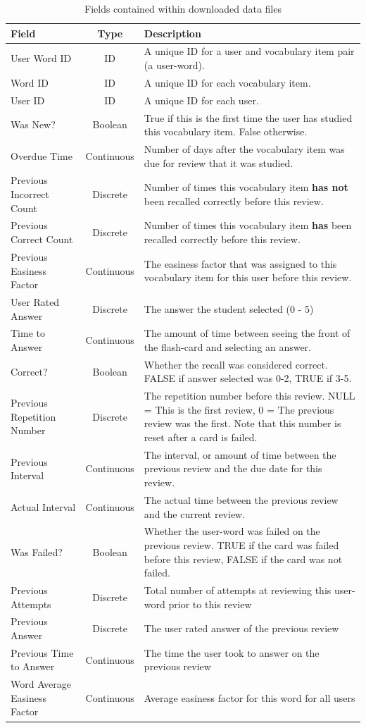 \begin{table}[h!]
\caption{Fields contained within downloaded data files}
\label{tbl_csvfields}
\begin{tabular}{|p{4cm}|c|p{9cm}|}
\hline
Field & Type & Description \\
\hline
User Word ID  & ID & A unique ID for a user and vocabulary item pair (a user-word). \\
Word ID  & ID & A unique ID for each vocabulary item. \\
User ID  & ID & A unique ID for each user. \\
Was New? & Boolean & True if this is the first time the user has studied this vocabulary item. False otherwise. \\
Overdue Time & Continuous & Number of days after the vocabulary item was due for review that it was studied.\\
Previous Incorrect Count & Discrete & Number of times this vocabulary item \textbf{has not} been recalled correctly before this review. \\
Previous Correct Count & Discrete & Number of times this vocabulary item \textbf{has} been recalled correctly before this review. \\
Previous Easiness Factor & Continuous & The easiness factor that was assigned to this vocabulary item for this user before this review. \\
User Rated Answer & Discrete & The answer the student selected (0 - 5) \\
Time to Answer & Continuous & The amount of time between seeing the front of the flash-card and selecting an answer. \\
Correct? & Boolean & Whether the recall was considered correct. FALSE if answer selected was 0-2, TRUE if 3-5. \\
Previous Repetition Number & Discrete & The repetition number before this review. NULL = This is the first review, 0 = The previous review was the first. Note that this number is reset after a card is failed. \\
Previous Interval  & Continuous & The interval, or amount of time between the previous review and the due date for this review. \\
Actual Interval & Continuous & The actual time between the previous review and the current review.\\
Was Failed? & Boolean & Whether the user-word was failed on the previous review. TRUE if the card was failed before this review, FALSE if the card was not failed.\\
Previous Attempts & Discrete & Total number of attempts at reviewing this user-word prior to this review \\
Previous Answer & Discrete & The user rated answer of the previous review \\
Previous Time to Answer & Continuous & The time the user took to answer on the previous review\\
Word Average Easiness Factor & Continuous & Average easiness factor for this word for all users\\
\hline
\end{tabular}
\end{table}


